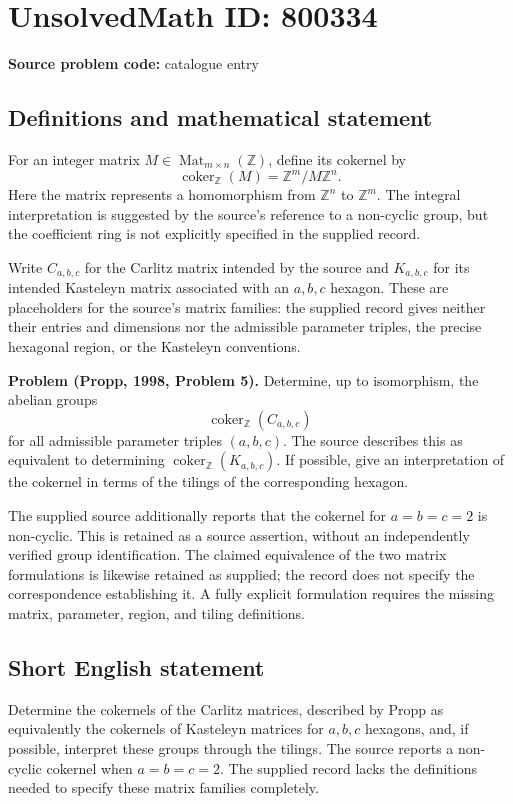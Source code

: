 \documentclass[11pt]{article}
\newcommand{\Z}{\mathbb{Z}}
\begin{document}
\section*{UnsolvedMath ID: 800334}
\textbf{Source problem code:} catalogue entry
\subsection{Definitions and mathematical statement}
For an integer matrix \(M\in\operatorname{Mat}_{m\times n}(\Z)\), define its cokernel by
\[
\operatorname{coker}_{\Z}(M)=\Z^m/M\Z^n.
\]
Here the matrix represents a homomorphism from \(\Z^n\) to \(\Z^m\). The integral interpretation is suggested by the source's reference to a non-cyclic group, but the coefficient ring is not explicitly specified in the supplied record.

Write \(C_{a,b,c}\) for the Carlitz matrix intended by the source and \(K_{a,b,c}\) for its intended Kasteleyn matrix associated with an \(a,b,c\) hexagon. These are placeholders for the source's matrix families: the supplied record gives neither their entries and dimensions nor the admissible parameter triples, the precise hexagonal region, or the Kasteleyn conventions.

\textbf{Problem (Propp, 1998, Problem 5).} Determine, up to isomorphism, the abelian groups
\[
\operatorname{coker}_{\Z}(C_{a,b,c})
\]
for all admissible parameter triples \((a,b,c)\). The source describes this as equivalent to determining \(\operatorname{coker}_{\Z}(K_{a,b,c})\). If possible, give an interpretation of the cokernel in terms of the tilings of the corresponding hexagon.

The supplied source additionally reports that the cokernel for \(a=b=c=2\) is non-cyclic. This is retained as a source assertion, without an independently verified group identification. The claimed equivalence of the two matrix formulations is likewise retained as supplied; the record does not specify the correspondence establishing it. A fully explicit formulation requires the missing matrix, parameter, region, and tiling definitions.
\subsection{Short English statement}
Determine the cokernels of the Carlitz matrices, described by Propp as equivalently the cokernels of Kasteleyn matrices for \(a,b,c\) hexagons, and, if possible, interpret these groups through the tilings. The source reports a non-cyclic cokernel when \(a=b=c=2\). The supplied record lacks the definitions needed to specify these matrix families completely.
\end{document}
